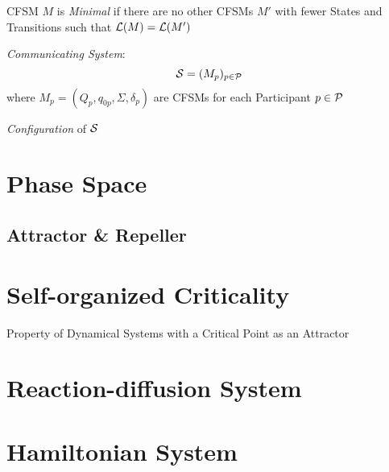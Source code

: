 CFSM $M$ is \emph{Minimal} if there are no other CFSMs $M'$ with fewer
States and Transitions such that $\mathcal{L}(M) = \mathcal{L}(M')$

\emph{Communicating System}:
\[
  \mathcal{S} = (M_p)_{p \in \mathcal{P}}
\]
where $M_p = (Q_p, q_{0p}, \Sigma, \delta_p)$ are CFSMs for each
Participant $p \in \mathcal{P}$

\emph{Configuration} of $\mathcal{S}$ %



\section{Phase Space}\label{sec:phase_space}

\subsection{Attractor \& Repeller}\label{sec:attractor_repeller}



\section{Self-organized Criticality}\label{sec:self_organized_criticality}

Property of Dynamical Systems with a Critical Point as an Attractor




\section{Reaction-diffusion System}\label{sec:reaction_diffusion}

\section{Hamiltonian System}\label{sec:hamiltonian_system}

